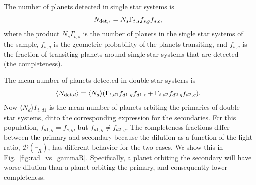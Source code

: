 \documentclass{emulateapj}
\begin{document}
The number of planets detected in single star systems is
\begin{equation}
N_{{\rm det},s} = N_s \Gamma_{t,s} f_{s,g} f_{s,c},
\end{equation}
where the product $N_s \Gamma_{t,s}$ is the number of planets in the single 
star systems of the sample, $f_{s,g}$ is the geometric probability of the 
planets transiting, and $f_{s,c}$ is the fraction of transiting planets around 
single star systems that are detected (the completeness).


The mean number of planets detected in double star systems is
\begin{equation}
\langle N_{{\rm det},d}\rangle = \langle N_d\rangle  
(\Gamma_{t,d1} f_{d1,g} f_{d1,c} + 
\Gamma_{t,d2} f_{d2,g} f_{d2,c} ).
\label{eq:N_det_d_2}
\end{equation}
Now $\langle N_d\rangle  \Gamma_{t,d1}$ is the mean number of planets orbiting 
the primaries of double star systems, ditto the corresponding expression for 
the secondaries.
For this population, $f_{d1,g} = f_{s,g}$, but $f_{d1,g} \neq f_{d2,g}$.
The completeness fractions differ between the primary and secondary because 
the dilution as a function of the light ratio, $\mathcal{D}(\gamma_R)$, has 
different behavior for the two cases.
We show this in Fig.~\ref{fig:rad_vs_gammaR}.
Specifically, a planet orbiting the secondary will have worse dilution than a 
planet orbiting the primary, and consequently lower completeness.
\end{document}
